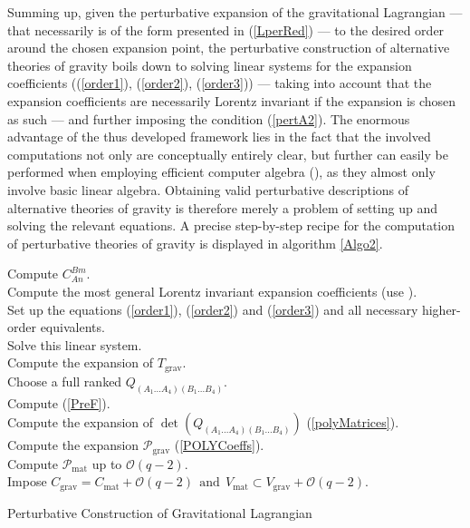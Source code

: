 \documentclass[%
preprint,
nofootinbib,
amsmath,amssymb,
aps,
prd,
floatfix,
]{revtex4-2}
\begin{document}
Summing up, given the perturbative expansion of the gravitational Lagrangian --- that necessarily is of the form presented in (\ref{LperRed}) --- to the desired order around the chosen expansion point, the perturbative construction of alternative theories of gravity boils down to solving linear systems for the expansion coefficients ((\ref{order1}), (\ref{order2}), (\ref{order3})) --- taking into account that the expansion coefficients are necessarily Lorentz invariant if the expansion is chosen as such --- and further imposing the condition
(\ref{pertA2}). The enormous advantage of the thus developed framework lies in the fact that the involved computations not only are conceptually entirely clear, but further can easily be performed when employing efficient computer algebra (\cite{sparse-tensor}), as they almost only involve basic linear algebra. Obtaining valid perturbative descriptions of alternative theories of gravity is therefore merely a problem of setting up and solving the relevant equations. A precise step-by-step recipe for the computation of perturbative theories of gravity is displayed in algorithm \ref{Algo2}.
\begin{algorithm}[hbt!]
\SetAlgoLined
{}
Compute $C^{Bm}_{An}$. \\
Compute the most general Lorentz invariant expansion coefficients (use \cite{sparse-tensor}).\\
Set up the equations (\ref{order1}), (\ref{order2}) and (\ref{order3}) and all necessary higher-order equivalents.\\
Solve this linear system. \\
Compute the expansion of $T_{\text{grav}}$.\\
Choose a full ranked $Q_{(A_1...A_4)(B_1...B_4)}$. \\
Compute (\ref{PreF}).\\
Compute the expansion of $\operatorname{det}(Q_{(A_1...A_4)(B_1...B_4)})$ (\ref{polyMatrices}). \\
Compute the expansion $\mathcal{P}_{\text{grav}}$ (\ref{POLYCoeffs}). \\
Compute $\mathcal{P}_{\text{mat}}$ up to $\mathcal{O}(q-2)$.\\
Impose $C_{\text{grav}} = C_{\text{mat}} + \mathcal{O}(q-2) \ \ \text{and} \ \ V_{\text{mat}} \subset V_{\text{grav}} + \mathcal{O}(q-2)$.
 \caption{Perturbative Construction of Gravitational Lagrangian}\label{Algo2}
\end{algorithm}
\end{document}
